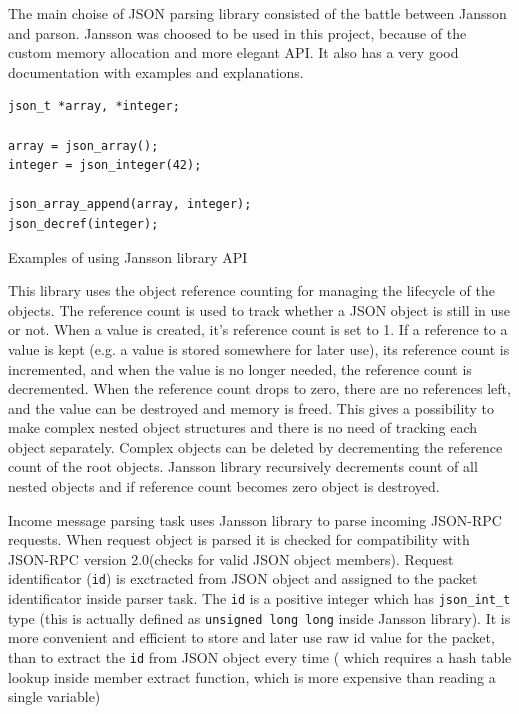The main choise of JSON parsing library consisted of the battle between Jansson and parson.
Jansson was choosed to be used in this project, because of the custom memory allocation and more elegant API.
It also has a very good documentation with examples and explanations.

\begin{listing}[h]
\begin{verbatim}
json_t *array, *integer;

array = json_array();
integer = json_integer(42);

json_array_append(array, integer);
json_decref(integer); 
\end{verbatim}
\caption{Examples of using Jansson library API}
\label{lst:jansson_example}
\end{listing}

This library uses the object reference counting for managing the lifecycle of the objects.
The reference count is used to track whether a JSON object is still in use or not. 
When a value is created, it’s reference count is set to 1. 
If a reference to a value is kept (e.g. a value is stored somewhere for later use), its reference count is incremented, and when the value is no longer needed, the reference count is decremented. 
When the reference count drops to zero, there are no references left, and the value can be destroyed and memory is freed.
This gives a possibility to make complex nested object structures and there is no need of tracking each object separately.
Complex objects can be deleted by decrementing the reference count of the root objects. 
Jansson library recursively decrements count of all nested objects and if reference count becomes zero object is destroyed.

Income message parsing task uses Jansson library to parse incoming JSON-RPC requests.
When request object is parsed it is checked for compatibility with JSON-RPC version 2.0(checks for valid JSON object members). 
Request identificator (\texttt{id}) is exctracted from JSON object and assigned to the packet identificator inside parser task.
The \texttt{id} is a positive integer which has \texttt{json\_int\_t} type (this is actually defined as \texttt{unsigned long long} inside Jansson library).
It is more convenient and efficient to store and later use raw id value for the packet, than to extract the \texttt{id} from JSON object every time
( which requires a hash table lookup inside member extract function, which is more expensive than reading a single variable)



